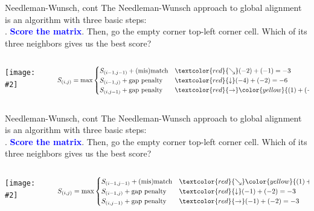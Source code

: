 \documentclass{beamer}
\renewcommand{\c}[1]{\begin{center}#1\end{center}}
\newcommand{\blu}[1]{\textcolor{blue}{\textbf{#1}}}
\newcommand{\gr}[2][.95]{\c{\texttt{[image: \#2]}}}
\begin{document}
\begin{frame}{Needleman-Wunsch, cont}
The Needleman-Wunsch approach to global alignment is an algorithm with three basic steps:\\
. \blu{Score the matrix}. Then, go the empty corner top-left corner cell. Which of its three neighbors gives us the best score?
\begin{columns}
\begin{column}{0.5\textwidth}
    \gr{l3_figs/s35_nw.png}
\end{column}
\begin{column}{0.5\textwidth}
\tiny
\[
S_{(i,j)} = \max \begin{cases}
    S_{(i-1,j-1)} + \text{(mis)match} &\textcolor{red}{\searrow} (-2) + (-1) = -3\\
    S_{(i-1,j)} + \text{gap penalty} &\textcolor{red}{\downarrow} (-4) + (-2) = -6\\
    S_{(i,j-1)} + \text{gap penalty} &\textcolor{red}{\rightarrow} \color{yellow}{(1) + (-2) = -1 \text{(MAX)}}
\end{cases}
\]
\end{column}
\end{columns}
\end{frame}

\begin{frame}{Needleman-Wunsch, cont}
The Needleman-Wunsch approach to global alignment is an algorithm with three basic steps:\\
. \blu{Score the matrix}. Then, go the empty corner top-left corner cell. Which of its three neighbors gives us the best score?
\begin{columns}
\begin{column}{0.5\textwidth}
    \gr{l3_figs/s36_nw.png}
\end{column}
\begin{column}{0.5\textwidth}
\tiny
\[
S_{(i,j)} = \max \begin{cases}
    S_{(i-1,j-1)} + \text{(mis)match} &\textcolor{red}{\searrow} \color{yellow}{(1) + (1) = 2 \text{(MAX)}}\\
    S_{(i-1,j)} + \text{gap penalty} &\textcolor{red}{\downarrow} (-1) + (-2) = -3\\
    S_{(i,j-1)} + \text{gap penalty} &\textcolor{red}{\rightarrow} (-1) + (-2) = -3
\end{cases}
\]
\end{column}
\end{columns}
\end{frame}
\end{document}
